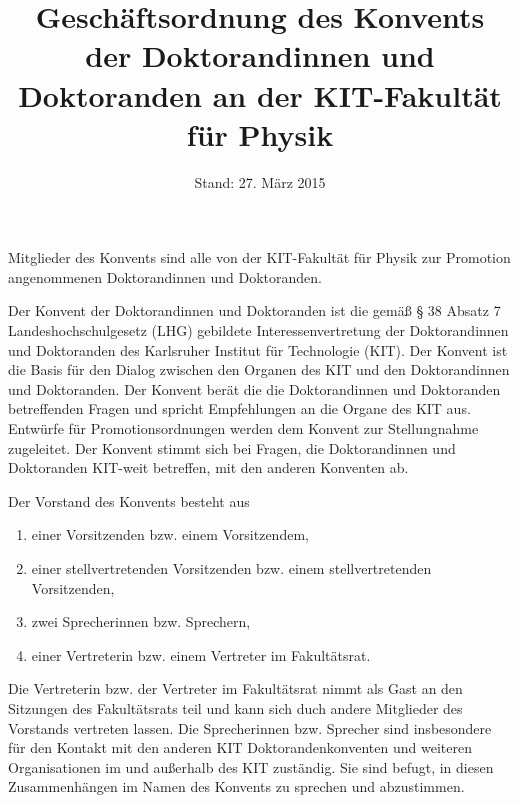 \documentclass[a4paper, parskip=half, numbers=noenddot]{scrartcl}
\title{Geschäftsordnung des Konvents der Doktorandinnen und Doktoranden an der KIT-Fakultät für Physik}
\date{Stand: 27. März 2015}
\begin{document}
%
%

\maketitle



\begin{contract}


\tableofcontents


%
%




Mitglieder des Konvents sind alle von der KIT-Fakultät für Physik zur Promotion angenommenen Doktorandinnen und Doktoranden. 

%
\label{aufgaben}

Der Konvent der Doktorandinnen und Doktoranden ist die gemäß § 38 Absatz 7 Landeshochschulgesetz (LHG) gebildete Interessenvertretung der Doktorandinnen und Doktoranden des Karlsruher Institut für Technologie (KIT). Der Konvent ist die Basis für den Dialog zwischen den Organen des KIT und den Doktorandinnen und Doktoranden. Der Konvent berät die die Doktorandinnen und Doktoranden betreffenden Fragen und spricht Empfehlungen an die Organe des KIT aus. Entwürfe für Promotionsordnungen werden dem Konvent zur Stellungnahme zugeleitet. Der Konvent stimmt sich bei Fragen, die Doktorandinnen und Doktoranden KIT-weit betreffen, mit den anderen Konventen ab.



Der Vorstand des Konvents besteht aus
\begin{enumerate}
	\item einer Vorsitzenden bzw. einem Vorsitzendem,
	\item einer stellvertretenden Vorsitzenden bzw. einem stellvertretenden Vorsitzenden,
	\item zwei Sprecherinnen bzw. Sprechern,
	\item einer Vertreterin bzw. einem Vertreter im Fakultätsrat.
\end{enumerate}
Die Vertreterin bzw. der Vertreter im Fakultätsrat nimmt als Gast an den Sitzungen des Fakultätsrats teil und kann sich duch andere Mitglieder des Vorstands vertreten lassen.
Die Sprecherinnen bzw. Sprecher sind insbesondere für den Kontakt mit den anderen KIT Doktorandenkonventen und weiteren Organisationen im und außerhalb des KIT zuständig. Sie sind befugt, in diesen Zusammenhängen im Namen des Konvents zu sprechen und abzustimmen.


\end{contract}
\end{document}
